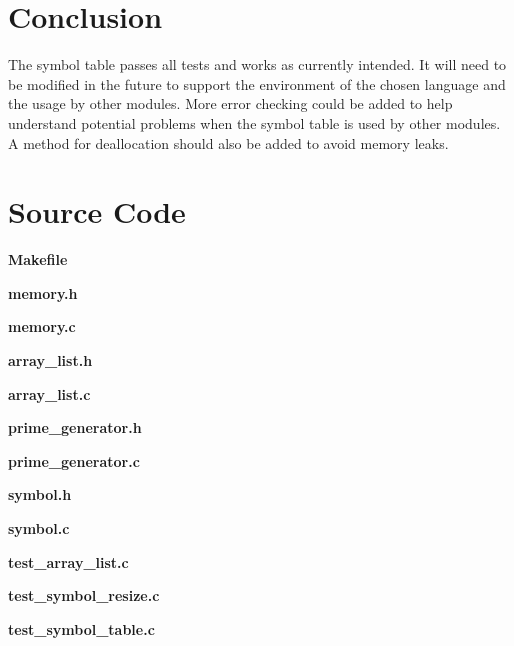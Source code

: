 \documentclass{article}
\begin{document}


\section{Conclusion}
The symbol table passes all tests and works as currently intended. It will need to be modified in the future to support the environment of the chosen language and the usage by other modules. More error checking could be added to help understand potential problems when the symbol table is used by other modules. A method for deallocation should also be added to avoid memory leaks.
\newpage

\appendix

\section{Source Code}
\textbf{Makefile}

\textbf{memory.h}

\textbf{memory.c}

\textbf{array\_list.h}

\textbf{array\_list.c}

\textbf{prime\_generator.h}

\textbf{prime\_generator.c}

\textbf{symbol.h}

\textbf{symbol.c}

\textbf{test\_array\_list.c}

\textbf{test\_symbol\_resize.c}

\textbf{test\_symbol\_table.c}

\end{document}
